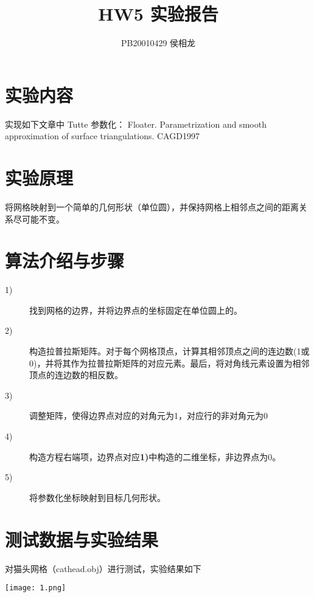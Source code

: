 \documentclass{article}
\title{HW5 实验报告}
\author{PB20010429 侯相龙}
\begin{document}
\maketitle
\section{实验内容}
实现如下文章中 Tutte 参数化：
Floater. Parametrization and smooth approximation of surface triangulations.
CAGD1997


\section{实验原理}
将网格映射到一个简单的几何形状（单位圆），并保持网格上相邻点之间的距离关系尽可能不变。

\section{算法介绍与步骤}
\begin{description}
    \item[1)]找到网格的边界，并将边界点的坐标固定在单位圆上的。
    \item[2)]构造拉普拉斯矩阵。对于每个网格顶点，计算其相邻顶点之间的连边数(1或0)，并将其作为拉普拉斯矩阵的对应元素。最后，将对角线元素设置为相邻顶点的连边数的相反数。
    \item[3)]调整矩阵，使得边界点对应的对角元为1，对应行的非对角元为0 
    \item[4)]构造方程右端项，边界点对应{\bf1)}中构造的二维坐标，非边界点为0。
    \item[5)]将参数化坐标映射到目标几何形状。
\end{description}


\section{测试数据与实验结果}
对猫头网格（cathead.obj）进行测试，实验结果如下

\texttt{[image: 1.png]}
\end{document}
